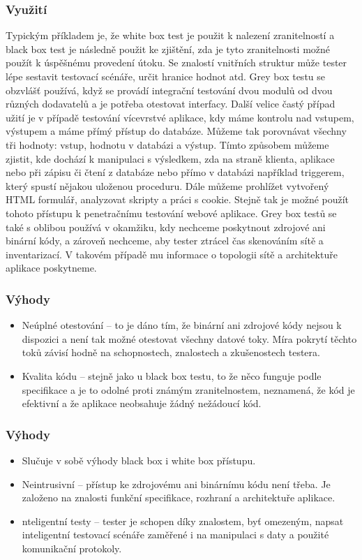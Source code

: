 \documentclass{article}
\begin{document}
\subsubsection{Využití}
Typickým příkladem je, že white box test je použit k nalezení zranitelností a black box test je následně použit ke zjištění, zda je tyto zranitelnosti možné použít k úspěšnému provedení útoku. Se znalostí vnitřních struktur může tester lépe sestavit testovací scénáře, určit hranice hodnot atd. Grey box testu se obzvlášť používá, když se provádí integrační testování dvou modulů od dvou různých dodavatelů a je potřeba otestovat interfacy. Další velice častý případ užití je v případě testování vícevrstvé aplikace, kdy máme kontrolu nad vstupem, výstupem a máme přímý přístup do databáze. Můžeme tak porovnávat všechny tři hodnoty: vstup, hodnotu v databázi a výstup. Tímto způsobem můžeme zjistit, kde dochází k manipulaci s výsledkem, zda na straně klienta, aplikace nebo při zápisu či čtení z databáze nebo přímo v databázi například triggerem, který spustí nějakou uloženou proceduru. Dále můžeme prohlížet vytvořený HTML formulář, analyzovat skripty a práci s cookie. Stejně tak je možné použít tohoto přístupu k penetračnímu testování webové aplikace. Grey box testů se také s oblibou používá v okamžiku, kdy nechceme poskytnout zdrojové ani binární kódy, a zároveň nechceme, aby tester ztrácel čas skenováním sítě a inventarizací. V takovém případě mu informace o topologii sítě a architektuře aplikace poskytneme.
\subsubsection{Výhody}
\begin{itemize}
    \item Neúplné otestování – to je dáno tím, že binární ani zdrojové kódy nejsou k dispozici a není tak možné otestovat všechny datové toky.  Míra pokrytí těchto toků závisí hodně na schopnostech, znalostech a zkušenostech testera.
    \item Kvalita kódu – stejně jako u black box testu, to že něco funguje podle specifikace a je to odolné proti známým zranitelnostem, neznamená, že kód je efektivní a že aplikace neobsahuje žádný nežádoucí kód.

\end{itemize}
\subsubsection{Výhody}
\begin{itemize}
    \item Slučuje v sobě výhody black box i white box přístupu.
    \item Neintrusivní – přístup ke zdrojovému ani binárnímu kódu není třeba. Je založeno na znalosti funkční specifikace, rozhraní a architektuře aplikace.
    \item nteligentní testy – tester je schopen díky znalostem, byť omezeným, napsat inteligentní testovací scénáře zaměřené i na manipulaci s daty a použité komunikační protokoly.
\end{itemize}
\end{document}

